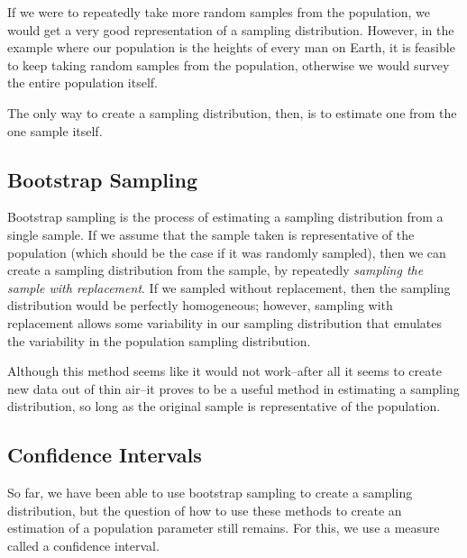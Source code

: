 \documentclass[10pt]{article}
\newcommand{\spacer}[0]{\par\vspace{0.1in}}
\begin{document}
If we were to repeatedly take more random samples from the population, we would get a very good representation of a sampling distribution. However, in the example where our population is the heights of every man on Earth, it is feasible to keep taking random samples from the population, otherwise we would survey the entire population itself. 
\spacer
The only way to create a sampling distribution, then, is to estimate one from the one sample itself.
\subsection{Bootstrap Sampling}
Bootstrap sampling is the process of estimating a sampling distribution from a single sample. If we assume that the sample taken is representative of the population (which should be the case if it was randomly sampled), then we can create a sampling distribution from the sample, by repeatedly \textit{sampling the sample with replacement}. If we sampled without replacement, then the sampling distribution would be perfectly homogeneous; however, sampling with replacement allows some variability in our sampling distribution that emulates the variability in the population sampling distribution.
\spacer
Although this method seems like it would not work--after all it seems to create new data out of thin air--it proves to be a useful method in estimating a sampling distribution, so long as the original sample is representative of the population.
\subsection{Confidence Intervals}
So far, we have been able to use bootstrap sampling to create a sampling distribution, but the question of how to use these methods to create an estimation of a population parameter still remains. For this, we use a measure called a confidence interval.
\end{document}
